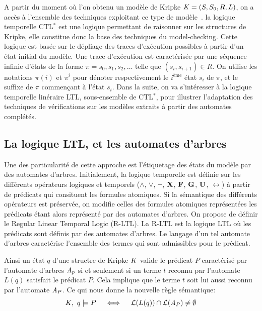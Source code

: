 A partir du moment où l'on obtenu un modèle de Kripke $\mathit K = (S, S_0,
R, L)$, on a accès à l'ensemble des techniques exploitant ce type de
modèle~\cite{MC-Book}. la logique temporelle CTL$^*$ est une logique permettant
de raisonner sur les structures de Kripke, elle constitue donc la base des techniques
du model-checking. Cette logique est basée sur le dépliage des traces
d'exécution possibles à partir d'un état initial du modèle. Une trace
d'exécution est caractérisée par une séquence infinie d'états de la
forme $\pi = s_0, s_1, s_2, \dots$ telle que $(s_i, s_{i+1}) \in
R$. On utilise les notations $\pi(i)$ et $\pi^i$ pour dénoter respectivement
le $i^\text{ème}$ état $s_i$ de $\pi$, et le suffixe de $\pi$ commençant à l'état $s_i$.
Dans la suite, on va s'intéresser à la logique temporelle linéraire LTL, sous-ensemble de CTL$^*$,
pour illustrer l'adaptation des techniques de vérifications sur les modèles extraits à partir 
des automates complétés.


\subsection{La logique LTL, et les automates d'arbres}

Une des particularité de cette approche est l'étiquetage des états du modèle par des automates d'arbres.
Initialement, la logique temporelle est définie sur les différents opérateurs logiques et temporels
($\land$, $\lor$, $\neg$, $\mathbf X$, $\mathbf F$, $\mathbf G$, $\mathbf U$, $\rel$) à partir de prédicats qui consituent 
les formules atomiques. Si la sémantique des différents opérateurs est préservée, on modifie celles des
formules atomiques représentées les prédicats étant alors représenté par des automates d'arbres.
On propose de définir le Regular Linear Temporal Logic (R-LTL). La R-LTL est la logique LTL où les prédicats sont définis par des
automates d'arbres. Le langage d'un tel automate d'arbres caractérise l'ensemble des termes qui sont admissibles pour le prédicat.

Ainsi un état $q$ d'une structre de Kripke $\mathit K$ valide le prédicat $P$ caractérisé
par l'automate d'arbres  $\mathit A_p$ si et seulement si un terme $t$ reconnu par l'automate
$L(q)$ satisfait le prédicat $P$. Cela implique que le terme $t$ soit lui aussi reconnu
par l'automate $\mathit A_P$. Ce qui nous donne la nouvelle règle sémantique:
\[\mathit K,\ q \models P\quad \; \Longleftrightarrow \;\quad \mathcal{L}{}(L(q)) \cap \mathcal{L}{}(\mathit A_P) \neq \emptyset\]

